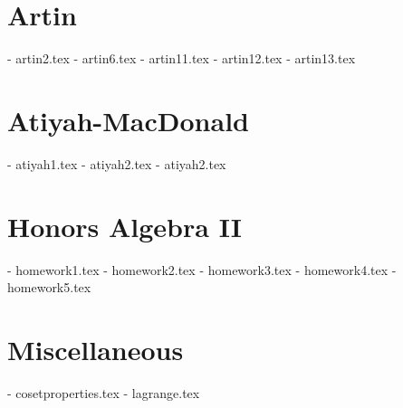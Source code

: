 \section{Artin}
- artin2.tex     %
- artin6.tex     %
- artin11.tex     %
- artin12.tex     %
- artin13.tex     %

\section{Atiyah-MacDonald}
- atiyah1.tex     %
- atiyah2.tex     %
- atiyah2.tex     %

\section{Honors Algebra II}
- homework1.tex
- homework2.tex
- homework3.tex
- homework4.tex
- homework5.tex

\section{Miscellaneous}
- cosetproperties.tex     %
- lagrange.tex     %
